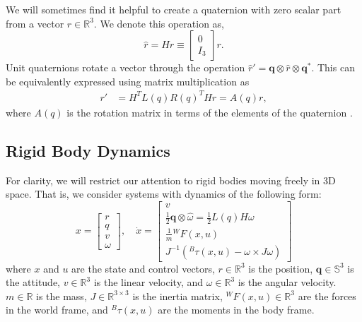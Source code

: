 \documentclass[letterpaper, 10 pt, conference]{ieeeconf}  %
\newcommand{\half}{\frac{1}{2}}
\newcommand{\R}{\mathbb{R}}
\newcommand{\Q}{\mathbb{S}^3}
\newcommand{\q}{\textbf{q}}
\newcommand{\inframe}[2]{{}^{#1}\!#2}
\begin{document}
        We will sometimes find it helpful to create a quaternion with zero scalar part from 
        a vector $r \in \R^3$. We denote this operation as,
        \begin{equation}
            \hat{r} = H r \equiv \begin{bmatrix} 0 \\ I_3 \end{bmatrix} r.
        \end{equation}
        Unit quaternions rotate a vector through the operation 
        $\hat{r}' = \q \otimes \hat{r} \otimes \q^*$. 
        This can be equivalently expressed using matrix multiplication as
        \begin{align} 
            r' &= H^T L(q) R(q)^T H r = A(q)r , \label{eq:quaternion_rotation}
        \end{align}
        where $A(q)$ is the rotation matrix in terms of the elements of the quaternion 
        \cite{kane1983spacecraftdynamics}.

    \subsection{Rigid Body Dynamics} \label{sec:rigidbody_dynamics}
        For clarity, we will restrict our attention to rigid bodies moving freely in 3D 
        space. That is, we consider systems with dynamics of the following form:
        \begin{equation} \label{eq:rigid_body_dynamics}
            x = \begin{bmatrix} r \\ q \\ v \\ \omega \end{bmatrix}, \quad 
            \dot{x} = \begin{bmatrix} 
                v \\ 
                \half \q \otimes \hat{\omega} = \half L(q) H \omega \\ 
                \frac{1}{m} \inframe{W}{F(x,u)} \\ 
                J^{-1}(\inframe{B}{\tau(x,u)} - \omega \times J \omega) 
            \end{bmatrix}
        \end{equation}
        where $x$ and $u$ are the state and control vectors, $r \in \R^3$ is the
        position, $\q \in \Q$ is the attitude, $v \in \R^3$ is the linear velocity, and
        $\omega \in \R^3$ is the angular velocity. $m \in \R$ is the mass, $J \in
        \R^{3\times3}$ is the inertia matrix, $\inframe{W}{F(x,u)} \in \R^3$ are the
        forces in the world frame, and $\inframe{B}{\tau(x,u)}$ are the moments in the
        body frame.
\end{document}
